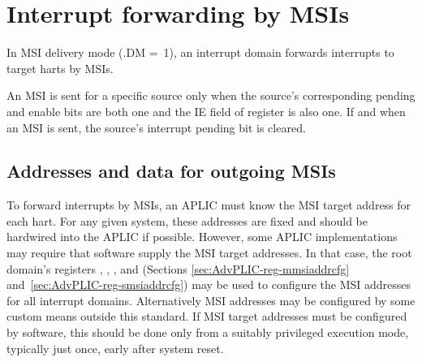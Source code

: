 \section{Interrupt forwarding by MSIs}

In MSI delivery mode (.DM =~1), an interrupt domain
forwards interrupts to target harts by MSIs.

An MSI is sent for a specific source only when the source's
corresponding pending and enable bits are both one and the IE field of
register  is also one.
If and when an MSI is sent, the source's interrupt pending bit is
cleared.

\subsection{Addresses and data for outgoing MSIs}
\label{sec:AdvPLIC-MSIAddrs}

To forward interrupts by MSIs, an APLIC must know the MSI target address
for each hart.
For any given system, these addresses are fixed and should be hardwired
into the APLIC if possible.
However, some APLIC implementations may require that software supply the
MSI target addresses.
In that case, the root domain's registers ,
, , and 
(Sections \ref{sec:AdvPLIC-reg-mmsiaddrcfg}
and~\ref{sec:AdvPLIC-reg-smsiaddrcfg}) may be used to configure the
MSI addresses for all interrupt domains.
Alternatively MSI addresses may be configured by some custom means
outside this standard.
If MSI target addresses must be configured by software, this should
be done only from a suitably privileged execution mode, typically just
once, early after system reset.

